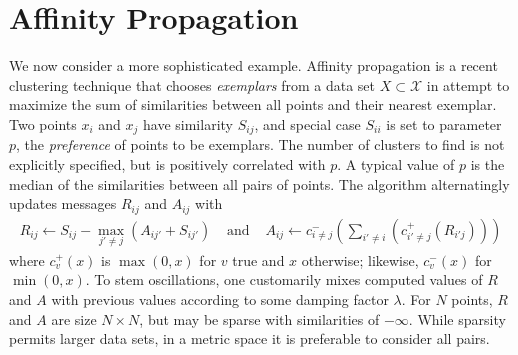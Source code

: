 \documentclass{article}
\newtheorem{definition} {Definition}
\newcommand{\killspace}{\vspace{-0.08in}}
\newcommand{\mysection}[1]{\vspace{-0.04in}\section{#1}\killspace}
\newcommand{\ocpos}[1]{c^{+}_{#1}}
\newcommand{\ocneg}[1]{c^{-}_{#1}}
\newcommand{\cpos}[2]{\ocpos{#1 \neq #2}}
\newcommand{\cneg}[2]{\ocneg{#1 \neq #2}}
\newcommand{\respo}[2]{R_{#1#2}}
\newcommand{\avail}[2]{A_{#1#2}}
\newcommand{\simil}[2]{S_{#1#2}}
\begin{document}



%


\mysection{Affinity Propagation}


We now consider a more sophisticated example.
Affinity propagation \cite{affinity} is a recent clustering technique
that chooses {\em exemplars} from a data set $X \subset \mathcal{X}$
in attempt to maximize the sum of similarities between all points and
their nearest exemplar.  Two points $x_i$ and $x_j$ have similarity
$\simil{i}{j}$, and special case $\simil{i}{i}$ is set to parameter
$p$, the {\em preference} of points to be exemplars.  The number of
clusters to find is not explicitly specified, but is positively
correlated with $p$.  A typical value of $p$ is the median of the
similarities between all pairs of points.
The algorithm alternatingly updates messages $\respo{i}{j}$ and
$\avail{i}{j}$ with
\[ \begin{array}{rcl}
  \respo{i}{j} \gets \simil{i}{j} - \max_{j' \neq j} (\avail{i}{j'} + \simil{i}{j'})
  & \text{ and } &
  \avail{i}{j} \gets \cneg{i}{j}( \sum_{i' \neq i} ( \cpos{i'}{j}(\respo{i'}{j}) ) )
\end{array} \]
where $\ocpos{v}(x)$ is $\max(0,x)$ for $v$ true and $x$ otherwise;
likewise, $\ocneg{v}(x)$ for $\min(0,x)$.
To stem oscillations, one customarily mixes computed values of $R$ and $A$ with previous values according to some damping factor $\lambda$.
For $N$ points, $R$ and $A$ are size $N \times N$, but may be sparse with similarities of $-\infty$.
While sparsity permits larger data sets, in a metric space it is preferable to consider all pairs.
\end{document}
